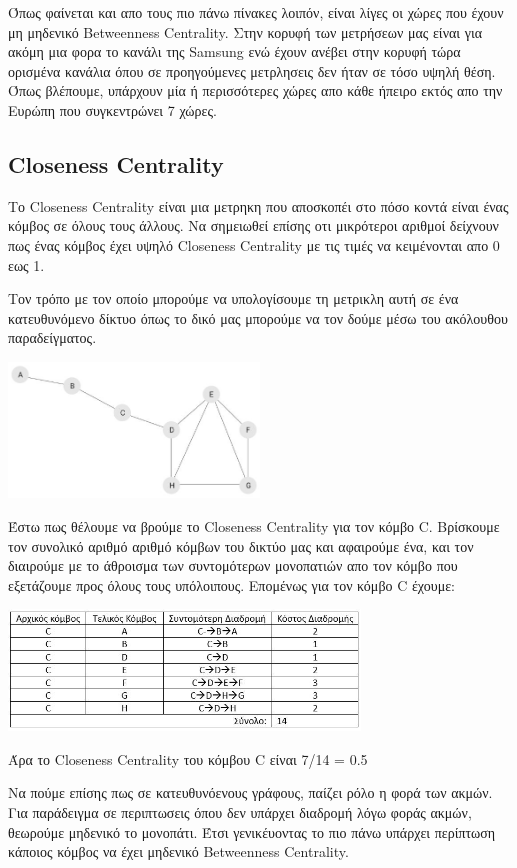 \documentclass[12pt]{article}
\begin{document}
	\vspace{12pt}
	Όπως φαίνεται και απο τους πιο πάνω πίνακες λοιπόν, είναι λίγες οι χώρες που έχουν μη μηδενικό Betweenness Centrality. Στην κορυφή των μετρήσεων μας είναι για ακόμη μια φορα το κανάλι της Samsung ενώ έχουν ανέβει στην κορυφή τώρα ορισμένα κανάλια όπου σε προηγούμενες μετρλησεις δεν ήταν σε τόσο υψηλή θέση. %
	Όπως βλέπουμε, υπάρχουν μία ή περισσότερες χώρες απο κάθε ήπειρο εκτός απο την Ευρώπη που συγκεντρώνει 7 χώρες.
	
	\newpage
	\subsection{Closeness Centrality}
	Το Closeness Centrality είναι μια μετρηκη που αποσκοπέι στο πόσο κοντά είναι ένας κόμβος σε όλους τους άλλους. Να σημειωθεί επίσης οτι μικρότεροι αριθμοί δείχνουν πως ένας κόμβος έχει υψηλό Closeness Centrality με τις τιμές να κειμένονται απο 0 εως 1.
	\par
	Τον τρόπο με τον οποίο μπορούμε να υπολογίσουμε τη μετρικλη αυτή σε ένα κατευθυνόμενο δίκτυο όπως το δικό μας μπορούμε να τον δούμε μέσω του ακόλουθου παραδείγματος.
	\begin{center}
		\includegraphics[width=0.5\textwidth]{photos-files/section7/closeness_centrality_example.JPG}
	\end{center}
	Έστω πως θέλουμε να βρούμε το Closeness Centrality για τον κόμβο C. Βρίσκουμε τον συνολικό αριθμό αριθμό κόμβων του δικτύο μας και αφαιρούμε ένα, και τον διαιρούμε με το άθροισμα των συντομότερων μονοπατιών απο τον κόμβο που εξετάζουμε προς όλους τους υπόλοιπους. Επομένως για τον κόμβο C έχουμε:
	\begin{center}
		\includegraphics[width=0.7\textwidth]{photos-files/section7/array_of_example.JPG}
	\end{center}
	Άρα το Closeness Centrality του κόμβου C είναι 7/14 = 0.5
	\par
	Να πούμε επίσης πως σε κατευθυνόενους γράφους, παίζει ρόλο η φορά των ακμών. Για παράδειγμα σε περιπτωσεις όπου δεν υπάρχει διαδρομή λόγω φοράς ακμών, θεωρούμε μηδενικό το μονοπάτι. Έτσι γενικέυοντας το πιο πάνω υπάρχει περίπτωση κάποιος κόμβος να έχει μηδενικό Betweenness Centrality.
	
\end{document}
